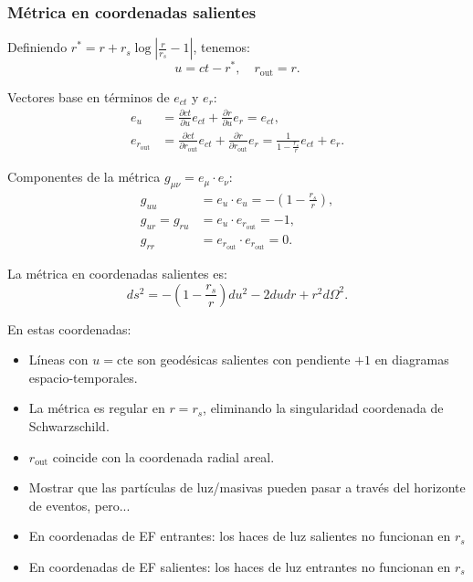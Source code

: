 \subsubsection{Métrica en coordenadas salientes}

Definiendo \( r^* = r + r_s \log \left| \frac{r}{r_s} - 1 \right| \), tenemos:
\begin{equation}
    u = ct - r^*, \quad r_{\text{out}} = r.
\end{equation}

Vectores base en términos de \( e_{ct} \) y \( e_r \):
\begin{equation}
    \begin{aligned}
        e_u                & = \frac{\partial ct}{\partial u} e_{ct} + \frac{\partial r}{\partial u} e_r = e_{ct},                                                             \\
        e_{r_{\text{out}}} & = \frac{\partial ct}{\partial r_{\text{out}}} e_{ct} + \frac{\partial r}{\partial r_{\text{out}}} e_r = \frac{1}{1 - \frac{r_s}{r}} e_{ct} + e_r.
    \end{aligned}
\end{equation}

Componentes de la métrica \( g_{\mu\nu} = e_\mu \cdot e_\nu \):
\begin{equation}
    \begin{aligned}
        g_{uu}          & = e_u \cdot e_u = -\left(1 - \frac{r_s}{r}\right), \\
        g_{ur} = g_{ru} & = e_u \cdot e_{r_{\text{out}}} = -1,               \\
        g_{rr}          & = e_{r_{\text{out}}} \cdot e_{r_{\text{out}}} = 0.
    \end{aligned}
\end{equation}

La métrica en coordenadas salientes es:
\begin{equation}
    ds^2 = -\left(1 - \frac{r_s}{r}\right) du^2 - 2 du dr + r^2 d\Omega^2.
\end{equation}


En estas coordenadas:
\begin{itemize}
    \item Líneas con \( u = \text{cte} \) son geodésicas salientes con pendiente \( +1 \) en diagramas espacio-temporales.
    \item La métrica es regular en \( r = r_s \), eliminando la singularidad coordenada de Schwarzschild.
    \item \( r_{\text{out}} \) coincide con la coordenada radial areal.
\end{itemize}
\begin{itemize}
    \item Mostrar que las partículas de luz/masivas pueden pasar a través del horizonte de eventos, pero...
    \item En coordenadas de EF entrantes: los haces de luz salientes no funcionan en $r_s$
    \item En coordenadas de EF salientes: los haces de luz entrantes no funcionan en $r_s$
\end{itemize}


